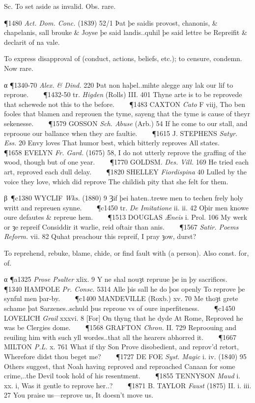 \begin{description}[wide, labelwidth=!, labelindent=0pt]
\begin{myenumerate}
 Sc. To set aside as invalid. Obs. rare.

\P 1480 \textit{Act.  Dom. Conc.} (1839) 52/1 Þat þe saidis provost, chanonis, \& chapelanis, sall brouke \& Joyse þe said landis..quhil þe said lettre be Repreifit \& declarit of na vale.

 To express disapproval of (conduct, actions, beliefs, etc.); to censure, condemn. Now rare.

α \P 1340-70 \textit{Alex.  \& Dind.} 220 Þat non haþel..mihte alegge any lak our lif to reproue.    
\P 1432-50 tr.  \textit{Higden} (Rolls) III. 401 Thyne arte is to be reprovede that schewede not this to the before.    
\P 1483 CAXTON  \textit{Cato} F viij, Tho ben fooles that blamen and reprouen the tyme, sayeng that the tyme is cause of theyr sekenesse.    
\P 1579 GOSSON  \textit{Sch. Abuse} (Arb.) 54 If he come to our stall, and reprooue our ballance when they are faultie.    
\P 1615 J. STEPHENS  \textit{Satyr. Ess.} 20 Envy loves That humor best, which bitterly reproves All states.    
\P 1658 EVELYN  \textit{Fr. Gard.} (1675) 58, I do not utterly reprove the graffing of the wood, though but of one year.    
\P 1770 GOLDSM.  \textit{Des. Vill.} 169 He tried each art, reproved each dull delay.    
\P 1820 SHELLEY  \textit{Fiordispina} 40 Lulled by the voice they love, which did reprove The childish pity that she felt for them.

β \P c1380 WYCLIF  \textit{Wks.} (1880) 9 Ȝif þei haten..trewe men to techen frely holy writt and repreuen synne.    
\P c1450 tr.  \textit{De Imitatione} ii. ii. 42 Oþir men knowe oure defautes \& repreue hem.    
\P 1513 DOUGLAS  \textit{Æneis} i. Prol. 106 My werk or ȝe repreif Considdir it warlie, reid oftair than anis.    
\P 1567  \textit{Satir. Poems Reform.} vii. 82 Quhat preachour this repreif, I pray ȝow, durst?

 To reprehend, rebuke, blame, chide, or find fault with (a person). Also const. for, of.

 α \P a1325 \textit{Prose  Psalter} xlix. 9 Y ne shal nouȝt repruue þe in þy sacrifices.    
\P 1340 HAMPOLE  \textit{Pr. Consc.} 5314 Alle þis sall he do þos openly To reprove þe synful men þar-by.    
\P c1400 MANDEVILLE (Roxb.) xv. 70 Me thoȝt grete schame þat Sarzenes..schuld þus reproue vs of oure inperfiteness.    
\P c1450 LOVELICH  \textit{Grail} xxxvi. 8 [For] On thyng that he dyde At Rome, Reproved he was be Clergies dome.    
\P 1568 GRAFTON  \textit{Chron.} II. 729 Reproouing and reuiling him with such yll wordes..that all the hearers abhorred it.    
\P 1667 MILTON  \textit{P.L.} x. 761 What if thy Son Prove disobedient, and reprov'd retort, Wherefore didst thou beget me?    
\P 1727 DE FOE  \textit{Syst. Magic} i. iv. (1840) 95 Others suggest, that Noah having reproved and reproached Canaan for some crime,..the Devil took hold of his resentment.    
\P 1855 TENNYSON  \textit{Maud} i. xx. i, Was it gentle to reprove her..?    
\P 1871 B. TAYLOR  \textit{Faust} (1875) II. i. iii. 27 You praise us—reprove us, It doesn't move us.


\end{myenumerate}
\end{description}
